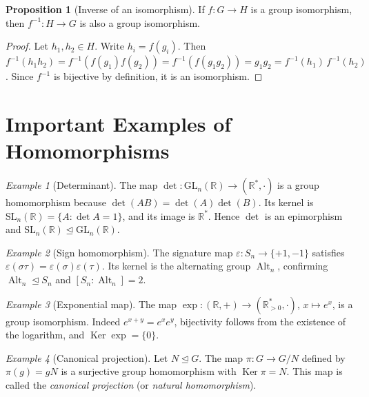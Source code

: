\documentclass[12pt,a4paper,openany]{book}
\theoremstyle{definition}
\newtheorem{proposition}{Proposition}[chapter]
\theoremstyle{remark}
\newtheorem{example}{Example}[chapter]
\newcommand{\R}{\mathbb{R}}
\DeclareMathOperator{\Alt}{Alt}
\DeclareMathOperator{\Ker}{Ker}
\begin{document}
\begin{proposition}[Inverse of an isomorphism]\label{prop:iso-inverse}
If $f\colon G\to H$ is a group isomorphism, then $f^{-1}\colon H\to G$
is also a group isomorphism.
\end{proposition}

\begin{proof}
Let $h_1,h_2\in H$.  Write $h_i=f(g_i)$.  Then
$f^{-1}(h_1 h_2)=f^{-1}(f(g_1)f(g_2))=f^{-1}(f(g_1 g_2))=g_1 g_2
=f^{-1}(h_1)\,f^{-1}(h_2)$.
Since $f^{-1}$ is bijective by definition, it is an isomorphism.
\end{proof}

\section{Important Examples of Homomorphisms}\label{sec:hom-examples}

\begin{example}[Determinant]\label{ex:det-hom}
The map $\det\colon \mathrm{GL}_n(\R)\to(\R^*,\cdot)$ is a group
homomorphism because $\det(AB)=\det(A)\det(B)$.  Its kernel is
$\mathrm{SL}_n(\R)=\{A : \det A = 1\}$, and its image is
$\R^*$.  Hence $\det$ is an epimorphism and
$\mathrm{SL}_n(\R)\trianglelefteq\mathrm{GL}_n(\R)$.
\end{example}

\begin{example}[Sign homomorphism]\label{ex:sign-hom}
The signature map $\varepsilon\colon S_n\to\{+1,-1\}$ satisfies
$\varepsilon(\sigma\tau)=\varepsilon(\sigma)\varepsilon(\tau)$.
Its kernel is the alternating group $\Alt_n$, confirming
$\Alt_n\trianglelefteq S_n$ and $[S_n:\Alt_n]=2$.
\end{example}

\begin{example}[Exponential map]\label{ex:exp-hom}
The map $\exp\colon(\R,+)\to(\R^*_{>0},\cdot)$, $x\mapsto e^x$, is a
group isomorphism.  Indeed $e^{x+y}=e^x e^y$, bijectivity follows from
the existence of the logarithm, and $\Ker\exp=\{0\}$.
\end{example}

\begin{example}[Canonical projection]\label{ex:canonical-projection}
Let $N\trianglelefteq G$.  The map $\pi\colon G\to G/N$ defined by
$\pi(g)=gN$ is a surjective group homomorphism with $\Ker\pi=N$.
This map is called the \emph{canonical projection}
(or \emph{natural homomorphism}).
\end{example}
\end{document}

